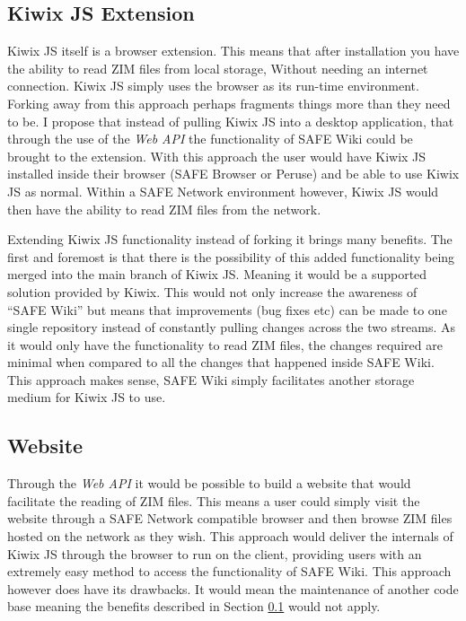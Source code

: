 \subsection{Kiwix JS Extension}
\label{subsec:kiwix-js-safe}

Kiwix JS itself is a browser extension. This means that after installation you have the ability to read ZIM files from local storage, Without needing an internet connection. Kiwix JS simply uses the browser as its run-time environment. Forking away from this approach perhaps fragments things more than they need to be. I propose that instead of pulling Kiwix JS into a desktop application, that through the use of the \textit{Web API} the functionality of SAFE Wiki could be brought to the extension.  With this approach the user would have Kiwix JS installed inside their browser (SAFE Browser or Peruse) and be able to use Kiwix JS as normal. Within a SAFE Network environment however, Kiwix JS would then have the ability to read ZIM files from the network.

Extending Kiwix JS functionality instead of forking it brings many benefits. The first and foremost is that there is the possibility of this added functionality being merged into the main branch of Kiwix JS. Meaning it would be a supported solution provided by Kiwix. This would not only increase the awareness of ``SAFE Wiki'' but means that improvements (bug fixes etc) can be made to one single repository instead of constantly pulling changes across the two streams. As it would only have the functionality to read ZIM files, the changes required are minimal when compared to all the changes that happened inside SAFE Wiki. This approach makes sense, SAFE Wiki simply facilitates another storage medium for Kiwix JS to use.

\subsection{Website}

Through the \textit{Web API} it would be possible to build a website that would facilitate the reading of ZIM files. This means a user could simply visit the website through a SAFE Network compatible browser and then browse ZIM files hosted on the network as they wish. This approach would deliver the internals of Kiwix JS through the browser to run on the client, providing users with an extremely easy method to access the functionality of SAFE Wiki. This approach however does have its drawbacks. It would mean the maintenance of another code base meaning the benefits described in Section \ref{subsec:kiwix-js-safe} would not apply.


